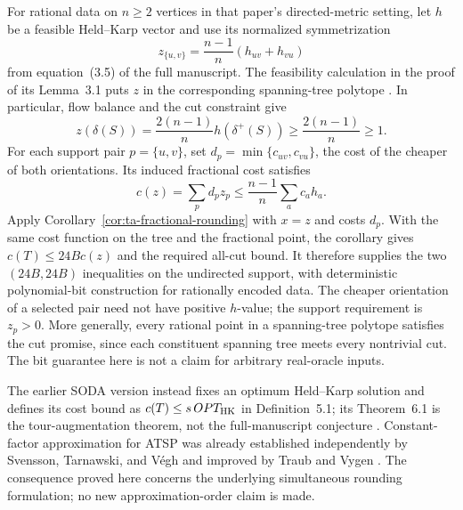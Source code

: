 For rational data on $n\ge2$ vertices in that paper's directed-metric
setting, let $h$ be a feasible Held--Karp vector and use its normalized
symmetrization
\[
 z_{\{u,v\}}=\frac{n-1}{n}(h_{uv}+h_{vu})
\]
from equation~(3.5) of the full manuscript. The feasibility calculation
in the proof of its Lemma~3.1 puts $z$ in the corresponding spanning-tree
polytope \cite[author full manuscript, equation~(3.5) and proof of Lemma~3.1]{AsadpourEtAl2017}.
In particular, flow balance and the cut constraint give
\[
 z(\delta(S))=\frac{2(n-1)}n h(\delta^+(S))
       \ge\frac{2(n-1)}n\ge1.
\]
For each support pair $p=\{u,v\}$, set
$d_p=\min\{c_{uv},c_{vu}\}$, the cost of the cheaper of both
orientations. Its induced fractional cost satisfies
\[
 c(z)=\sum_p d_pz_p\le\frac{n-1}{n}\sum_a c_a h_a.
\]
Apply Corollary~\ref{cor:ta-fractional-rounding} with $x=z$ and costs
$d_p$. With the same cost function on the tree and the fractional
point, the corollary gives $c(T)\le24B c(z)$ and the required all-cut
bound. It therefore supplies the two $(24B,24B)$ inequalities on the
undirected support, with deterministic polynomial-bit construction
for rationally encoded data. The cheaper orientation of a selected
pair need not have positive $h$-value; the support requirement is
$z_p>0$. More generally,
every rational point in a spanning-tree polytope satisfies the cut
promise, since each constituent spanning tree meets every nontrivial
cut. The bit guarantee here is not a claim for arbitrary real-oracle
inputs.

The earlier SODA version instead fixes an optimum Held--Karp solution
and defines its cost bound as $c(T)\le s\,OPT_{\rm HK}$ in
Definition~5.1; its Theorem~6.1 is the tour-augmentation theorem, not
the full-manuscript conjecture
\cite[Definition~5.1 and Theorem~6.1]{AsadpourEtAl2010}.
Constant-factor approximation for ATSP was already established
independently by Svensson, Tarnawski, and V\'egh and improved by Traub
and Vygen \cite{SvenssonTarnawskiVegh2020,TraubVygen2022}.
The consequence proved here concerns the underlying simultaneous
rounding formulation; no new approximation-order claim is made.
